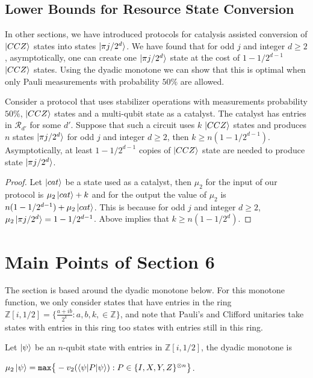 \documentclass[12pt]{dalthesis}
\begin{document}
\section{Lower Bounds for Resource State Conversion}
In other sections, we have introduced protocols for catalysis assisted conversion of $\ket{CCZ}$ states into states $\ket{\pi j /2^d}$. We have found that for odd $j$ and integer $d \geq 2$, asymptotically, one can create one $\ket{\pi j /2^d}$ state at the cost of $1 - 1/2^{d-1}$ $\ket{CCZ}$ states. Using the dyadic monotone we can show that this is optimal when only Pauli measurements with probability $50 \% $ are allowed.


\begin{lemma}
Consider a protocol that uses stabilizer operations with measurements probability $50 \% $, $\ket{CCZ}$ states and a multi-qubit state as a catalyst. The catalyst has entries in $\mathcal{R}_{d'}$ for some $d'$. Suppose that such a circuit uses $k$ $\ket{CCZ}$ states and produces $n$ states $\ket{\pi j/2^d}$ for odd $j$ and integer $d \geq 2$, then $k \geq n(1-1/2^{d-1})$. Asymptotically, at least $1 - 1/2^{d-1}$ copies of $\ket{CCZ}$ state are needed to produce state $\ket{\pi j/2^d}$.
\end{lemma}
\begin{proof}
Let $\ket{cat}$ be a state used as a catalyst, then $\mu_2$ for the input of our protocol is $\mu_2 \ket{cat} + k$ and for the output the value of $\mu_2$ is $n(1-1/2^{d-1}) + \mu_2\ket{cat}$. This is because for odd $j$ and integer $d \geq 2$, $\mu_2 \ket{\pi j/2^d} = 1 - 1/2^{d-1}$. Above implies that $k \geq n(1 - 1/2^d)$.
\end{proof}

\chapter{Main Points of Section 6}
The section is based around the dyadic monotone below. For this monotone function, we only consider states that have entries in the ring $\mathbb{Z}[i, 1/2] = \big\{\frac{a+ib}{2^k}: a, b, k, \in \mathbb{Z} \big\}$, and note that Pauli's and Clifford unitaries take states with entries in this ring too states with entries still in this ring.



\begin{definition}
Let $\ket{\psi}$ be an $n$-qubit state with entries in $\mathbb{Z}[i, 1/2]$, the dyadic monotone is 
\begin{center}
$\mu_2 \ket{\psi} = \texttt{max} \big\{-v_2(\braket{\psi | P | \psi}): P \in \{I, X, Y, Z \}^{\otimes n} \big\}$.
\end{center}
\end{definition}
\end{document}
